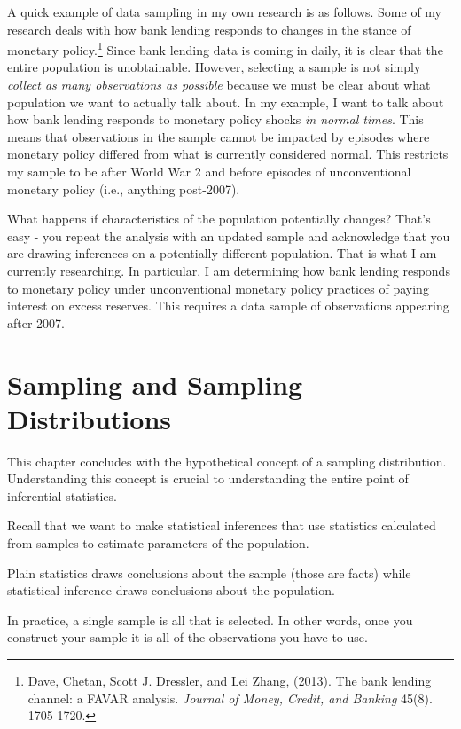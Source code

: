 \documentclass[
]{book}
\begin{document}
A quick example of data sampling in my own research is as follows. Some of my research deals with how bank lending responds to changes in the stance of monetary policy.\footnote{Dave, Chetan, Scott J. Dressler, and Lei Zhang, (2013). The bank lending channel: a FAVAR analysis. \emph{Journal of Money, Credit, and Banking} 45(8). 1705-1720.} Since bank lending data is coming in daily, it is clear that the entire population is unobtainable. However, selecting a sample is not simply \emph{collect as many observations as possible} because we must be clear about what population we want to actually talk about. In my example, I want to talk about how bank lending responds to monetary policy shocks \emph{in normal times}. This means that observations in the sample cannot be impacted by episodes where monetary policy differed from what is currently considered normal. This restricts my sample to be after World War 2 and before episodes of unconventional monetary policy (i.e., anything post-2007).

What happens if characteristics of the population potentially changes? That's easy - you repeat the analysis with an updated sample and acknowledge that you are drawing inferences on a potentially different population. That is what I am currently researching. In particular, I am determining how bank lending responds to monetary policy under unconventional monetary policy practices of paying interest on excess reserves. This requires a data sample of observations appearing after 2007.

\hypertarget{sampling-and-sampling-distributions}{%
\section{Sampling and Sampling Distributions}\label{sampling-and-sampling-distributions}}

This chapter concludes with the hypothetical concept of a sampling distribution. Understanding this concept is crucial to understanding the entire point of inferential statistics.

Recall that we want to make statistical inferences that use statistics calculated from samples to estimate parameters of the population.

Plain statistics draws conclusions about the sample (those are facts) while statistical inference draws conclusions about the population.

In practice, a single sample is all that is selected. In other words, once you construct your sample it is all of the observations you have to use.
\end{document}
